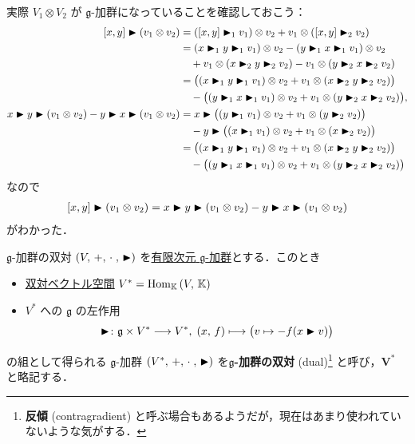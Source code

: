 \documentclass[rep_main]{subfiles}
\begin{document}
実際 $V_1 \otimes V_2$ が $\mathfrak{g}$-加群になっていることを確認しておこう：
\begin{align}
	\comm{x}{y} \btr (v_1 \otimes v_2)
	&= (\comm{x}{y} \btr_1 v_1) \otimes v_2 + v_1 \otimes (\comm{x}{y} \btr_2 v_2) \\
	&= (x \btr_1 y \btr_1 v_1) \otimes v_2 - (y \btr_1 x \btr_1 v_1) \otimes v_2 \\
	&\quad + v_1 \otimes (x \btr_2 y \btr_2 v_2) - v_1 \otimes (y \btr_2 x \btr_2 v_2) \\
	&= \bigl( (x \btr_1 y \btr_1 v_1) \otimes v_2 + v_1 \otimes (x \btr_2 y \btr_2 v_2) \bigr) \\
	&\quad - \bigl( (y \btr_1 x \btr_1 v_1) \otimes v_2 + v_1 \otimes (y \btr_2 x \btr_2 v_2) \bigr), \\
	x \btr y \btr (v_1 \otimes v_2) - y \btr x \btr (v_1 \otimes v_2)
	&= x \btr \bigl( (y \btr_1 v_1) \otimes v_2 + v_1 \otimes (y \btr_2 v_2) \bigr) \\
	&\quad - y \btr \bigl( (x \btr_1 v_1) \otimes v_2 + v_1 \otimes (x \btr_2 v_2) \bigr) \\
	&= \bigl( (x \btr_1 y \btr_1 v_1) \otimes v_2 + v_1 \otimes (x \btr_2 y \btr_2 v_2) \bigr) \\
	&\quad - \bigl( (y \btr_1 x \btr_1 v_1) \otimes v_2 + v_1 \otimes (y \btr_2 x \btr_2 v_2) \bigr)
\end{align}
なので
\begin{align}
	\comm{x}{y} \btr (v_1 \otimes v_2)  = x \btr y \btr (v_1 \otimes v_2) - y \btr x \btr (v_1 \otimes v_2)
\end{align}
がわかった．

\begin{mydef}[label=def:gmod-dual]{$\mathfrak{g}$-加群の双対}
	$(V,\, +,\, \cdot\;,\, \blacktriangleright)$ を\underline{有限次元}\hyperref[ax:g-module]{ $\mathfrak{g}$-加群}とする．このとき
	\begin{itemize}
		\item \hyperref[def:hom-vec]{双対ベクトル空間} $V^* = \mathrm{Hom}_{\mathbb{K}} \mathop{}(V,\, \mathbb{K})$
		\item $V^*$ への $\mathfrak{g}$ の左作用
		\begin{align}
			\blacktriangleright \colon \mathfrak{g} \times V^* \longrightarrow V^*,\; (x,\, f) \longmapsto \bigl(v \mapsto - f(x \blacktriangleright v)\bigr)
		\end{align}
	\end{itemize}
	の組として得られる $\mathfrak{g}$-加群 $(V^*,\, +,\, \cdot\;,\, \blacktriangleright)$ を\textbf{$\bm{\mathfrak{g}}$-加群の双対} (dual)\footnote{\textbf{反傾} (contragradient) と呼ぶ場合もあるようだが，現在はあまり使われていないような気がする．} と呼び，$\bm{V^*}$ と略記する．
	
\end{mydef}
\end{document}
